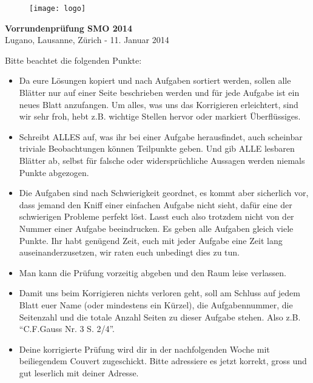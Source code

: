 \documentclass[12pt,a4paper]{article}
\begin{document}
\thispagestyle{empty}
\begin{figure}[h]
\texttt{[image: logo]}
\end{figure}

\vspace{1cm}

\begin{center}
\Huge{\textbf{Vorrundenprüfung SMO 2014}}\\[1.5cm]
\large{Lugano, Lausanne, Zürich - 11. Januar 2014}\\[3.5cm]
\end{center}


Bitte beachtet die folgenden Punkte:

\begin{itemize}
\item Da eure Lösungen kopiert und nach Aufgaben sortiert werden, sollen alle Blätter nur auf einer Seite beschrieben werden und für jede Aufgabe ist ein neues Blatt anzufangen. Um alles, was uns das Korrigieren erleichtert, sind wir sehr froh, hebt z.B. wichtige Stellen hervor oder markiert Überflüssiges.

\item Schreibt ALLES auf, was ihr bei einer Aufgabe herausfindet, auch scheinbar triviale Beobachtungen können Teilpunkte geben. Und gib ALLE lesbaren Blätter ab, selbst für falsche oder widersprüchliche Aussagen werden niemals Punkte abgezogen.

\item Die Aufgaben sind nach Schwierigkeit geordnet, es kommt aber sicherlich vor, dass jemand den Kniff einer einfachen Aufgabe nicht sieht, dafür eine der schwierigen Probleme perfekt löst. Lasst euch also trotzdem nicht von der Nummer einer Aufgabe beeindrucken. Es geben alle Aufgaben gleich viele Punkte. Ihr habt genügend Zeit, euch mit jeder Aufgabe eine Zeit lang auseinanderzusetzen, wir raten euch unbedingt dies zu tun.

\item Man kann die Prüfung vorzeitig abgeben und den Raum leise verlassen.

\item Damit uns beim Korrigieren nichts verloren geht, soll am Schluss auf jedem Blatt euer Name (oder mindestens ein Kürzel), die Aufgabennummer, die Seitenzahl und die totale Anzahl Seiten zu dieser Aufgabe stehen. Also z.B. "`C.F.Gauss Nr. 3 S. 2/4"'.

\item Deine korrigierte Prüfung wird dir in der nachfolgenden Woche mit beiliegendem Couvert zugeschickt. Bitte adressiere es jetzt korrekt, gross und gut leserlich mit deiner Adresse.
\end{itemize}
\end{document}
